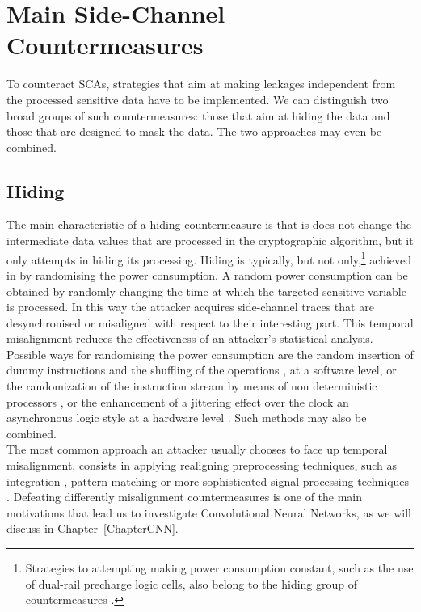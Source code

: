 \section{Main Side-Channel Countermeasures}\label{sec:countermeasures}
To counteract SCAs, strategies that aim at making leakages independent from the processed sensitive data have to be implemented. We can distinguish two broad groups of such countermeasures: 
those that aim at hiding the data and those that are designed to mask the data. The two approaches may even be combined.

\subsection{Hiding}
The main characteristic of a hiding countermeasure is that is does not change the intermediate data values that are processed in the cryptographic algorithm, but it only attempts in hiding its processing. Hiding is typically, but not only,\footnote{Strategies to attempting making power consumption constant, such as the use of dual-rail precharge logic cells, also belong to the hiding group of countermeasures \cite{popp2005masked}.} achieved in by randomising the power consumption. A random power consumption can be obtained by randomly changing the time at which the targeted sensitive variable is processed. In this way the attacker acquires side-channel traces that are desynchronised or misaligned with respect to their interesting part. This temporal misalignment reduces the effectiveness of an attacker's statistical analysis. Possible ways for randomising the power consumption are the random insertion of dummy instructions \cite{coron2009efficient,coron2010analysis} and the shuffling of the operations \cite{veyrat2012shuffling}, at a software level, or the randomization of the instruction stream by means of non deterministic processors \cite{irwin2002instruction,may2001non}, or the enhancement of a jittering effect over the clock \via an asynchronous logic style at a hardware level \cite{moore2002improving,moore2003balanced}. Such methods may also be combined. \\

The most common approach an attacker usually chooses to face up temporal misalignment, consists in applying realigning preprocessing techniques, such as integration \cite{mangard2004hardware,mangard2008power}, pattern matching \cite{nagashima2007dpa} or more sophisticated signal-processing techniques \cite{van2011improving}. Defeating differently misalignment countermeasures is one of the main motivations that lead us to investigate Convolutional Neural Networks, as we will discuss in Chapter~\ref{ChapterCNN}.

